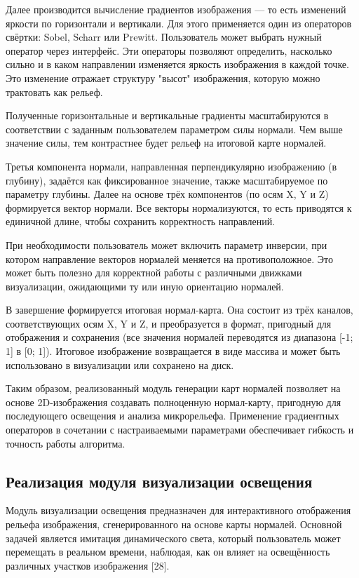 Далее производится вычисление градиентов изображения — то есть изменений яркости по горизонтали и вертикали. Для этого применяется один из операторов свёртки: Sobel, Scharr или Prewitt. Пользователь может выбрать нужный оператор через интерфейс. Эти операторы позволяют определить, насколько сильно и в каком направлении изменяется яркость изображения в каждой точке. Это изменение отражает структуру "высот" изображения, которую можно трактовать как рельеф.

Полученные горизонтальные и вертикальные градиенты масштабируются в соответствии с заданным пользователем параметром силы нормали. Чем выше значение силы, тем контрастнее будет рельеф на итоговой карте нормалей.

Третья компонента нормали, направленная перпендикулярно изображению (в глубину), задаётся как фиксированное значение, также масштабируемое по параметру глубины. Далее на основе трёх компонентов (по осям X, Y и Z) формируется вектор нормали. Все векторы нормализуются, то есть приводятся к единичной длине, чтобы сохранить корректность направлений.

При необходимости пользователь может включить параметр инверсии, при котором направление векторов нормалей меняется на противоположное. Это может быть полезно для корректной работы с различными движками визуализации, ожидающими ту или иную ориентацию нормалей.

В завершение формируется итоговая нормал-карта. Она состоит из трёх каналов, соответствующих осям X, Y и Z, и преобразуется в формат, пригодный для отображения и сохранения (все значения нормалей переводятся из диапазона [-1; 1] в [0; 1]). Итоговое изображение возвращается в виде массива и может быть использовано в визуализации или сохранено на диск.

Таким образом, реализованный модуль генерации карт нормалей позволяет на основе 2D-изображения создавать полноценную нормал-карту, пригодную для последующего освещения и анализа микрорельефа. Применение градиентных операторов в сочетании с настраиваемыми параметрами обеспечивает гибкость и точность работы алгоритма.
\subsection{Реализация модуля визуализации освещения}

Модуль визуализации освещения предназначен для интерактивного отображения рельефа изображения, сгенерированного на основе карты нормалей. Основной задачей является имитация динамического света, который пользователь может перемещать в реальном времени, наблюдая, как он влияет на освещённость различных участков изображения [28].

